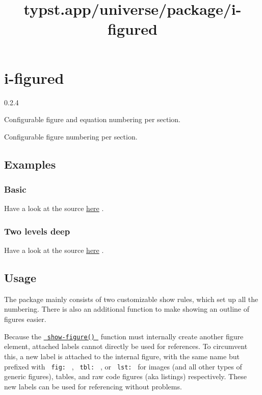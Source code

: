 \title{typst.app/universe/package/i-figured}

\label{banner}
\section{i-figured}\label{i-figured}

{ 0.2.4 }

Configurable figure and equation numbering per section.

\label{readme}
Configurable figure numbering per section.

\subsection{Examples}\label{examples}

\subsubsection{Basic}\label{basic}

Have a look at the source
\href{https://github.com/typst/packages/raw/main/packages/preview/i-figured/0.2.4/examples/basic.typ}{here}
.


\subsubsection{Two levels deep}\label{two-levels-deep}

Have a look at the source
\href{https://github.com/typst/packages/raw/main/packages/preview/i-figured/0.2.4/examples/level-two.typ}{here}
.


\subsection{Usage}\label{usage}

The package mainly consists of two customizable show rules, which set up
all the numbering. There is also an additional function to make showing
an outline of figures easier.

Because the
\href{https://github.com/typst/packages/raw/main/packages/preview/i-figured/0.2.4/\#show-figure}{\texttt{\ show-figure()\ }}
function must internally create another figure element, attached labels
cannot directly be used for references. To circumvent this, a new label
is attached to the internal figure, with the same name but prefixed with
\texttt{\ fig:\ } , \texttt{\ tbl:\ } , or \texttt{\ lst:\ } for images
(and all other types of generic figures), tables, and raw code figures
(aka listings) respectively. These new labels can be used for
referencing without problems.

